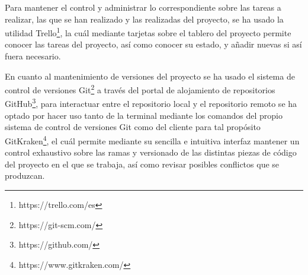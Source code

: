 Para mantener el control y administrar lo correspondiente sobre las tareas a realizar, las que se han realizado y las realizadas del proyecto, se ha usado la utilidad Trello\footnote{https://trello.com/es}, la cuál mediante tarjetas sobre el tablero del proyecto permite conocer las tareas del proyecto, así como conocer su estado, y añadir nuevas si así fuera necesario.

En cuanto al mantenimiento de versiones del proyecto se ha usado el sistema de control de versiones Git\footnote{https://git-scm.com/} a través del portal de alojamiento de repositorios GitHub\footnote{https://github.com/}, para interactuar entre el repositorio local y el repositorio remoto se ha optado por hacer uso tanto de la terminal mediante los comandos del propio sistema de control de versiones Git como del cliente para tal propósito GitKraken\footnote{https://www.gitkraken.com/}, el cuál permite mediante su sencilla e intuitiva interfaz mantener un control exhaustivo sobre las ramas y versionado de las distintas piezas de código del proyecto en el que se trabaja, así como revisar posibles conflictos que se produzcan.

